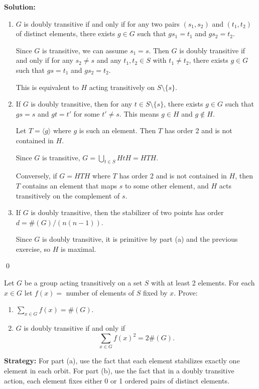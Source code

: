 \noindent\textbf{Solution:}
\begin{enumerate}[label=(\alph*)]
\item $G$ is doubly transitive if and only if for any two pairs $(s_1, s_2)$ and $(t_1, t_2)$ of distinct elements, there exists $g \in G$ such that $gs_1 = t_1$ and $gs_2 = t_2$.

Since $G$ is transitive, we can assume $s_1 = s$. Then $G$ is doubly transitive if and only if for any $s_2 \neq s$ and any $t_1, t_2 \in S$ with $t_1 \neq t_2$, there exists $g \in G$ such that $gs = t_1$ and $gs_2 = t_2$.

This is equivalent to $H$ acting transitively on $S \setminus \{s\}$.

\item If $G$ is doubly transitive, then for any $t \in S \setminus \{s\}$, there exists $g \in G$ such that $gs = s$ and $gt = t'$ for some $t' \neq s$. This means $g \in H$ and $g \notin H$.

Let $T = \langle g \rangle$ where $g$ is such an element. Then $T$ has order 2 and is not contained in $H$.

Since $G$ is transitive, $G = \bigcup_{t \in S} HtH = HTH$.

Conversely, if $G = HTH$ where $T$ has order 2 and is not contained in $H$, then $T$ contains an element that maps $s$ to some other element, and $H$ acts transitively on the complement of $s$.

\item If $G$ is doubly transitive, then the stabilizer of two points has order $d = \#(G)/(n(n-1))$.

Since $G$ is doubly transitive, it is primitive by part (a) and the previous exercise, so $H$ is maximal.
\end{enumerate}


\qed
\begin{problembox}
Let $G$ be a group acting transitively on a set $S$ with at least 2 elements. For each $x \in G$ let $f(x) = $ number of elements of $S$ fixed by $x$. Prove:
\begin{enumerate}[label=(\alph*)]
\item $\sum_{x \in G} f(x) = \#(G).$
\item $G$ is doubly transitive if and only if
\[\sum_{x \in G} f(x)^2 = 2 \#(G).\]
\end{enumerate}
\end{problembox}

\noindent\textbf{Strategy:} For part (a), use the fact that each element stabilizes exactly one element in each orbit. For part (b), use the fact that in a doubly transitive action, each element fixes either 0 or 1 ordered pairs of distinct elements.

